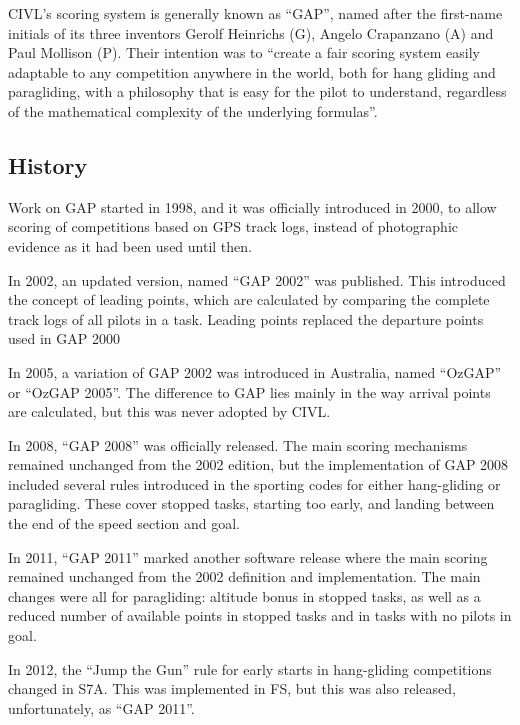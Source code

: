 CIVL’s scoring system is generally known as “GAP”, named after the first-name
initials of its three inventors Gerolf Heinrichs (G), Angelo Crapanzano (A) and
Paul Mollison (P). Their intention was to “create a fair scoring system easily
adaptable to any competition anywhere in the world, both for hang gliding and
paragliding, with a philosophy that is easy for the pilot to understand,
regardless of the mathematical complexity of the underlying formulas”.

\subsection{History}
Work on GAP started in 1998, and it was officially introduced in 2000, to allow
scoring of competitions based on GPS track logs, instead of photographic
evidence as it had been used until then.

In 2002, an updated version, named “GAP 2002” was published. This introduced
the concept of leading points, which are calculated by comparing the complete
track logs of all pilots in a task. Leading points replaced the departure
points used in GAP 2000

In 2005, a variation of GAP 2002 was introduced in Australia, named “OzGAP” or
“OzGAP 2005”. The difference to GAP lies mainly in the way arrival points are
calculated, but this was never adopted by CIVL.

In 2008, “GAP 2008” was officially released. The main scoring mechanisms
remained unchanged from the 2002 edition, but the implementation of GAP 2008
included several rules introduced in the sporting codes for either hang-gliding
or paragliding. These cover stopped tasks, starting too early, and landing
between the end of the speed section and goal.

In 2011, “GAP 2011” marked another software release where the main scoring
remained unchanged from the 2002 definition and implementation. The main
changes were all for paragliding: altitude bonus in stopped tasks, as well as
a reduced number of available points in stopped tasks and in tasks with no
pilots in goal.

In 2012, the “Jump the Gun” rule for early starts in hang-gliding competitions
changed in S7A. This was implemented in FS, but this was also released,
unfortunately, as “GAP 2011”.

